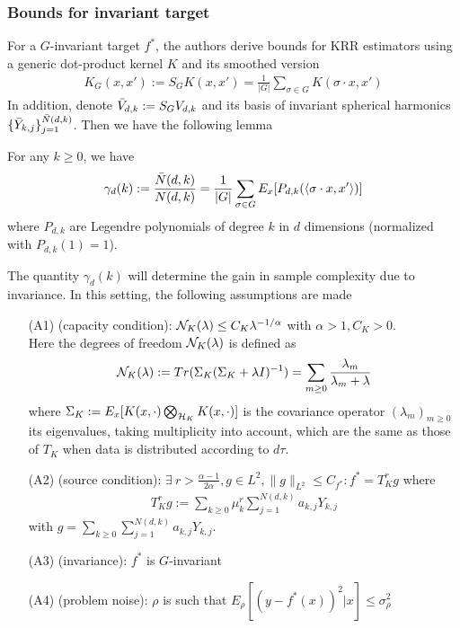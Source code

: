\subsubsection{Bounds for invariant target}
For a $G$-invariant target $f^*$, the authors derive bounds for KRR estimators using a generic dot-product kernel $K$ and its smoothed version
\begin{align}
    K_G(x,x') := S_GK(x,x') = \frac{1}{|G|}\sum_{\sigma\in G}K(\sigma\cdot x,x')
\end{align}
In addition, denote $\Bar{V}_{d,k}:=S_G V_{d,k}$ and its basis of invariant spherical harmonics $\{\Bar{Y}_{k,j}\}_{j=1}^{\Bar{N}(d,k)}$. Then we have the following lemma
\begin{lemma}
    For any $k\ge 0$, we have
    \begin{align}
        \gamma_d(k):=\frac{\Bar{N}(d,k)}{N(d,k)}=\frac{1}{|G|}\sum_{\sigma\in G}E_x[P_{d,k}(\langle \sigma\cdot x,x'\rangle)]
    \end{align}
    where $P_{d,k}$ are Legendre polynomials of degree $k$ in $d$ dimensions (normalized with $P_{d,k}(1)=1$).
\end{lemma}
The quantity $\gamma_d(k)$ will determine the gain in sample complexity due to invariance. In this setting, the following assumptions are made
\begin{enumerate}
    \item[(A1)] (capacity condition): $\mathcal{N}_K(\lambda)\le C_K\lambda^{-1/\alpha}$ with $\alpha >1, C_K>0$.\\
Here the degrees of freedom $\mathcal{N}_K(\lambda)$ is defined as
\begin{align}\label{def_N}
    \mathcal{N}_K(\lambda) := Tr(\Sigma_K(\Sigma_K+\lambda I)^{-1}) = \sum_{m\ge 0} \frac{\lambda_m}{\lambda_m+\lambda}
\end{align}
where $\Sigma_K:= E_x[K(x,\cdot)\bigotimes_{\mathcal{H}_K}K(x,\cdot)]$ is the covariance operator $(\lambda_m)_{m\ge0}$ its eigenvalues, taking multiplicity into account, which are the same as those of $T_K$ when data is distributed according to $d\tau$. 
    \item[(A2)] (source condition): $\exists\ r>\frac{\alpha-1}{2\alpha}, g\in L^2, \|g\|_{L^2}\le C_{f^*}:f^*= T^r_Kg$ where
    \begin{align}
        T_K^rg := \sum_{k\ge 0}\mu_k^r\sum_{j=1}^{N(d,k)}a_{k,j}Y_{k,j}
    \end{align}
    with $g = \sum_{k\ge 0}\sum_{j=1}^{N(d,k)}a_{k,j}Y_{k,j}$.
    \item[(A3)] (invariance): $f^*$ is $G$-invariant
    \item[(A4)] (problem noise): $\rho$ is such that $E_\rho[(y-f^*(x))^2|x]\le \sigma^2_\rho$
\end{enumerate}
